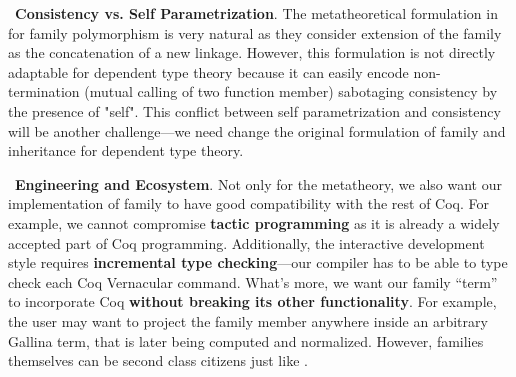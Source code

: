 ~\textbf{Consistency vs. Self Parametrization}. The metatheoretical formulation in~\citet{zm2017} for family polymorphism is very natural as they consider extension of the family as the concatenation of a new linkage. However, this formulation is not directly adaptable for dependent type theory because it can easily encode non-termination (mutual calling of two function member) sabotaging consistency by the presence of "self". This conflict between self parametrization and consistency will be another challenge---we need change the original formulation of family and inheritance for dependent type theory.


~\textbf{Engineering and Ecosystem}.  Not only for the metatheory, we also want our implementation of family to have good compatibility with the rest of Coq. For example, we cannot compromise \textbf{tactic programming} as it is already a widely accepted part of Coq programming. Additionally, the interactive development style requires \textbf{incremental type checking}---our compiler has to be able to type check each Coq Vernacular command. What's more, we want our family ``term'' to incorporate Coq \textbf{without breaking its other functionality}. For example, the user may want to project the family member anywhere inside an arbitrary Gallina term, that is later being computed and normalized. However, families themselves can be second class citizens just like \citet{zm2017}.




